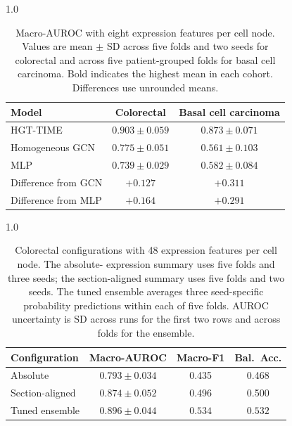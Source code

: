 \begin{table}[!htbp]
\centering
\caption{Macro-AUROC with eight expression features per cell node. Values are mean $\pm$ SD
across five folds and two seeds for colorectal and across five patient-grouped folds for basal
cell carcinoma. Bold indicates the
highest mean in each cohort. Differences use unrounded means.}
\label{tab:main}
\begin{spacing}{1.0}\normalsize
\setlength{\tabcolsep}{4pt}\renewcommand{\arraystretch}{1.2}
\begin{tabularx}{\linewidth}{@{}Xcc@{}}
\toprule
Model & Colorectal & Basal cell carcinoma \\
\midrule
HGT-TIME & $\mathbf{0.903\pm0.059}$ & $\mathbf{0.873\pm0.071}$ \\
Homogeneous GCN & $0.775\pm0.051$ & $0.561\pm0.103$ \\
MLP & $0.739\pm0.029$ & $0.582\pm0.084$ \\
\midrule
Difference from GCN & $+0.127$ & $+0.311$ \\
Difference from MLP & $+0.164$ & $+0.291$ \\
\bottomrule
\end{tabularx}
\end{spacing}
\end{table}

\begin{table}[!tp]
\centering
\caption{Colorectal configurations with 48 expression features per cell node. The absolute-
expression summary uses five folds and three seeds; the section-aligned summary uses five folds
and two seeds. The tuned ensemble averages three seed-specific probability predictions within
each of five folds. AUROC uncertainty is SD across runs for the first two rows and across folds
for the ensemble.}
\label{tab:scale}
\begin{spacing}{1.0}\normalsize
\setlength{\tabcolsep}{4pt}\renewcommand{\arraystretch}{1.2}\begin{tabularx}{\linewidth}{@{}Xccc@{}}
\toprule
Configuration & Macro-AUROC & Macro-F1 & Bal.\ Acc. \\
\midrule
Absolute & $0.793\pm0.034$ & 0.435 & 0.468 \\
Section-aligned & $0.874\pm0.052$ & 0.496 & 0.500 \\
Tuned ensemble & $\mathbf{0.896\pm0.044}$ & $\mathbf{0.534}$ & $\mathbf{0.532}$ \\
\bottomrule
\end{tabularx}
\end{spacing}
\end{table}

